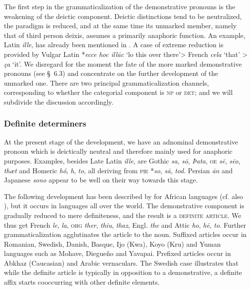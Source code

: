 The first step in the grammaticalization of the demonstrative pronouns is the weakening of the deictic component. Deictic distinctions tend to be neutralized, the paradigm is reduced, and at the same time its unmarked member, namely that of third person deixis, assumes a primarily anaphoric function. An example, Latin \textit{ille}, has already been mentioned in . A case of extreme reduction is provided by Vulgar Latin *\textit{ecce hoc ill\=ac} ‘lo this over there’{\textgreater} French \textit{cela} ‘that’ {\textgreater} \textit{ça} ‘it’. We disregard for the moment the fate of the more marked demonstrative pronouns (see §~6.3) and concentrate on the further development of the unmarked one. There are two principal grammaticalization channels, corresponding to whether the categorial component is \textsc{np} or \textsc{det}; and we will subdivide the discussion accordingly.

\subsubsection{Definite determiners}
At the present stage of the development, we have an adnominal demonstrative pronoun which is deictically neutral and therefore mainly used for anaphoric purposes. Examples, besides Late Latin \textit{ille}, are Gothic \textit{sa}, \textit{s\=o}, \textit{Þata}, \textsc{oe} \textit{s\=e}, \textit{s\=eo}, \textit{thæt} and Homeric \textit{hó}, \textit{h}, \textit{to}, all deriving from \textsc{pie} *\textit{so}, \textit{s\=a}, \textit{tod}. Persian \textit{\=an} and Japanese \textit{sono} appear to be well on their way towards this stage.

The following development has been described by \citet{Greenberg1978} for African languages (cf. also \citealt[§~3]{Givón1978}), but it occurs in languages all over the world. The demonstrative component is gradually reduced to mere definiteness, and the result is a \textsc{definite article}. We thus get French \textit{le}, \textit{la}, \textsc{ohg} \textit{ther}, \textit{thiu}, \textit{thaz}, Engl. \textit{the} and Attic \textit{ho}, \textit{h\=e}, \textit{to}. Further grammaticalization agglutinates the article to the noun. Suffixed articles occur in Romanian, Swedish, Danish, Basque, Ijo (Kwa), Koyo (Kru) and Yuman languages such as Mohave, Diegueño and Yavapai. Prefixed articles occur in Abkhaz (Caucasian) and Arabic vernaculars.\label{page42} The Swedish case illustrates that while the definite article is typically in opposition to a demonstrative, a definite affix starts cooccurring with other definite elements.

